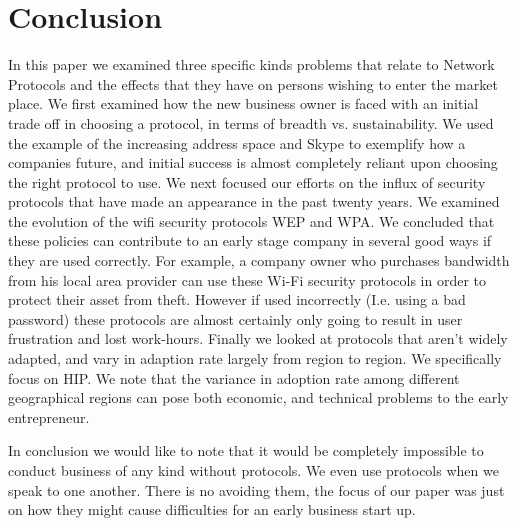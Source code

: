 \section{Conclusion}
In this paper we examined three specific kinds problems that relate to Network Protocols and the effects that they have on persons wishing to enter the market place. We first examined how the new business owner is faced with an initial trade off in choosing a protocol, in terms of breadth vs. sustainability. We used the example of the increasing address space and Skype to exemplify how a companies future, and initial success is almost completely reliant upon choosing the right protocol to use. We next focused our efforts on the influx of security protocols that have made an appearance in the past twenty years. We examined the evolution of the wifi security protocols WEP and WPA. We concluded that these policies can contribute to an early stage company in several good ways if they are used correctly. For example, a company owner who purchases bandwidth from his local area provider can use these Wi-Fi security protocols in order to protect their asset from theft. However if used incorrectly (I.e. using a bad password) these protocols are almost certainly only going to result in user frustration and lost work-hours. Finally we looked at protocols that aren't widely adapted, and vary in adaption rate largely from region to region. We specifically focus on HIP. We note that the variance in adoption rate among different geographical regions can pose both economic, and technical problems to the early entrepreneur.


In conclusion we would like to note that it would be completely impossible to conduct business of any kind without protocols. We even use protocols when we speak to one another. There is no avoiding them, the focus of our paper was just on how they might cause difficulties for an early business start up. 